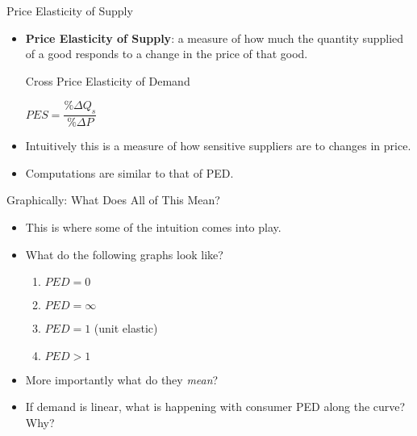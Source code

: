 \documentclass[aspectratio=169]{beamer}
\begin{document}
\begin{frame}{Price Elasticity of Supply}
    \begin{itemize}
        \item \textbf{Price Elasticity of Supply}: a measure of how much the quantity supplied
        of a good responds to a change in the price of that good.
        \vspace{5mm}
        \begin{block}{Cross Price Elasticity of Demand}
            \begin{center}
                $ PES = \dfrac{\% \Delta Q_s}{\% \Delta P}  $
            \end{center}    
        \end{block}
        \item Intuitively this is a measure of how sensitive suppliers are to changes in price.
        \item Computations are similar to that of PED. 
    \end{itemize}
\end{frame}

\begin{frame}{Graphically: What Does All of This Mean?}
    
    \begin{itemize}
        \item This is where some of the intuition comes into play.
        \vspace{5mm}
        \item What do the following graphs look like?
        \vspace{2mm}
            \begin{enumerate}
                \item $PED = 0$ 
                \item $PED = \infty$
                \item $PED = 1$ (unit elastic)
                \item $PED  >  1$
            \end{enumerate}
        \vspace{5mm}
        \item More importantly what do they \textit{mean}?
        \vspace{5mm}
        \item If demand is linear, what is happening with consumer PED along the curve? Why?
    \end{itemize}
\end{frame}
\end{document}
